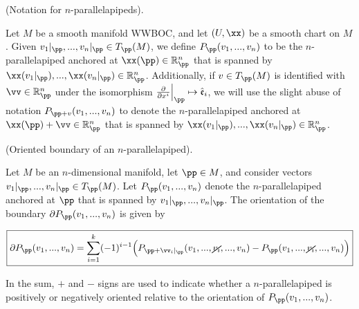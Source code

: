 \begin{defn}
    (Notation for $n$-parallelapipeds).
    
    Let $M$ be a smooth manifold WWBOC, and let $(U, \xx)$ be a smooth chart on $M$. Given ${v_1|_\pp, ..., v_n|_\pp \in T_\pp(M)}$, we define $P_\pp(v_1, ..., v_n)$ to be the $n$-parallelapiped anchored at $\xx(\pp) \in \R^n_\pp$ that is spanned by \\ ${\xx(v_1|_\pp), ..., \xx(v_n|_\pp) \in \R^n_\pp}$. Additionally, if $v \in T_\pp(M)$ is identified with $\vv \in \R^n_\pp$ under the isomorphism ${\frac{\pd}{\pd x^i}\Big|_\pp \mapsto \see_i}$, we will use the slight abuse of notation $P_{\pp + v}(v_1, ..., v_n)$ to denote the $n$-parallelapiped anchored at $\xx(\pp) + \vv \in \R^n_\pp$ that is spanned by $\xx(v_1|_\pp), ..., \xx(v_n|_\pp) \in \R^n_\pp$.
\end{defn}

\begin{theorem}
\label{ch::manifolds::thm::oriented_bdy_parallelapiped}

     (Oriented boundary of an $n$-parallelapiped).
    
    Let $M$ be an $n$-dimensional manifold, let $\pp \in M$, and consider vectors $v_1|_\pp, ..., v_n|_\pp \in T_\pp(M)$. Let $P_\pp(v_1, ..., v_n)$ denote the $n$-parallelapiped anchored at $\pp$ that is spanned by $v_1|_\pp, ..., v_n|_\pp$. The orientation of the boundary $\pd P_\pp(v_1, ..., v_n)$ is given by 
    
    \begin{align*}
        \boxed
        {
            \pd P_\pp(v_1, ..., v_n) = \sum_{i = 1}^k (-1)^{i - 1} \Big( P_{\pp + \vv_i|_\pp}(v_1, ..., \cancel{v_i}, ..., v_n) - P_{\pp}(v_1, ..., \cancel{v_i}, ..., v_n) \Big)
        }
    \end{align*}
    
    In the sum, $+$ and $-$ signs are used to indicate whether a $n$-parallelapiped is positively or negatively oriented relative to the orientation of $P_\pp(v_1, ..., v_n)$.
\end{theorem}

